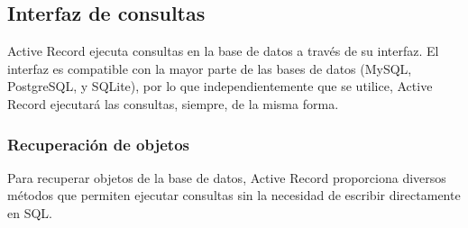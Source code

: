 \subsection{Interfaz de consultas}
Active Record ejecuta consultas en la base de datos a través de su interfaz. El interfaz es compatible con la mayor parte de las bases de datos (MySQL, PostgreSQL, y SQLite), por lo que independientemente que se utilice, Active Record ejecutará las consultas, siempre, de la misma forma.

\subsubsection{Recuperación de objetos}
Para recuperar objetos de la base de datos, Active Record proporciona diversos métodos que permiten ejecutar consultas sin la necesidad de escribir directamente en SQL.

